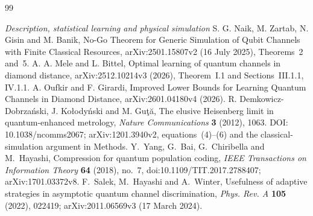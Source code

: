 \begin{thebibliography}{99}
\item[]\textit{Description, statistical learning and physical simulation}
 S. G. Naik, M. Zartab, N. Gisin and M. Banik,
No-Go Theorem for Generic Simulation of Qubit Channels with Finite
Classical Resources, arXiv:2501.15807v2 (16 July 2025),
Theorems~2 and~5.
 A. A. Mele and L. Bittel,
Optimal learning of quantum channels in diamond distance,
arXiv:2512.10214v3 (2026), Theorem~I.1 and Sections~III.1.1, IV.1.1.
 A. Oufkir and F. Girardi,
Improved Lower Bounds for Learning Quantum Channels in Diamond
Distance, arXiv:2601.04180v4 (2026).
 R. Demkowicz-Dobrza\'nski, J. Ko\l ody\'nski
and M. Gu\c{t}\u{a}, The elusive Heisenberg limit in quantum-enhanced
metrology, \emph{Nature Communications} \textbf{3} (2012), 1063.
DOI: 10.1038/ncomms2067; arXiv:1201.3940v2, equations~(4)--(6)
and the classical-simulation argument in Methods.
 Y.~Yang, G.~Bai, G.~Chiribella and M.~Hayashi,
Compression for quantum population coding,
\emph{IEEE Transactions on Information Theory} \textbf{64} (2018), no.~7,
doi:10.1109/TIT.2017.2788407;
arXiv:1701.03372v8.
 F.~Salek, M.~Hayashi and A.~Winter,
Usefulness of adaptive strategies in asymptotic quantum channel
 discrimination, \emph{Phys. Rev. A} \textbf{105} (2022), 022419;
arXiv:2011.06569v3 (17 March 2024).
\end{thebibliography}
